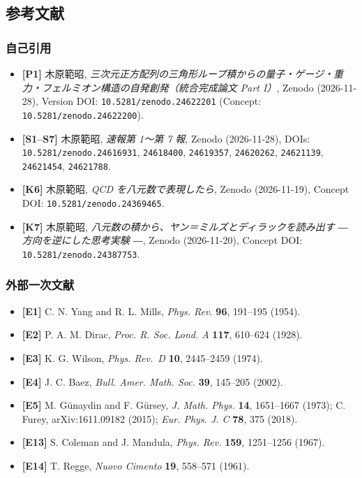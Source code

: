 \documentclass[
  a4paper,
]{ltjsarticle}
\providecommand{\tightlist}{%
  \setlength{\itemsep}{0pt}\setlength{\parskip}{0pt}}
\begin{document}
\subsection{参考文献}\label{ux53c2ux8003ux6587ux732e}

\subsubsection{自己引用}\label{ux81eaux5df1ux5f15ux7528}

\begin{itemize}
\tightlist
\item
  \textbf{{[}P1{]}} 木原範昭,
  \emph{三次元正方配列の三角形ループ積からの量子・ゲージ・重力・フェルミオン構造の自発創発（統合完成論文
  Part I）}, Zenodo (2026-11-28), Version DOI:
  \texttt{10.5281/zenodo.24622201} (Concept:
  \texttt{10.5281/zenodo.24622200}).
\item
  \textbf{{[}S1--S7{]}} 木原範昭, \emph{速報第 1〜第 7 報}, Zenodo
  (2026-11-28), DOIs: \texttt{10.5281/zenodo.24616931},
  \texttt{24618400}, \texttt{24619357}, \texttt{24620262},
  \texttt{24621139}, \texttt{24621454}, \texttt{24621788}.
\item
  \textbf{{[}K6{]}} 木原範昭, \emph{QCD を八元数で表現したら}, Zenodo
  (2026-11-19), Concept DOI: \texttt{10.5281/zenodo.24369465}.
\item
  \textbf{{[}K7{]}} 木原範昭,
  \emph{八元数の積から、ヤン＝ミルズとディラックを読み出す ―
  方向を逆にした思考実験 ―}, Zenodo (2026-11-20), Concept DOI:
  \texttt{10.5281/zenodo.24387753}.
\end{itemize}

\subsubsection{外部一次文献}\label{ux5916ux90e8ux4e00ux6b21ux6587ux732e}

\begin{itemize}
\tightlist
\item
  \textbf{{[}E1{]}} C. N. Yang and R. L. Mills, \emph{Phys. Rev.}
  \textbf{96}, 191--195 (1954).
\item
  \textbf{{[}E2{]}} P. A. M. Dirac, \emph{Proc. R. Soc. Lond. A}
  \textbf{117}, 610--624 (1928).
\item
  \textbf{{[}E3{]}} K. G. Wilson, \emph{Phys. Rev.~D} \textbf{10},
  2445--2459 (1974).
\item
  \textbf{{[}E4{]}} J. C. Baez, \emph{Bull. Amer. Math. Soc.}
  \textbf{39}, 145--205 (2002).
\item
  \textbf{{[}E5{]}} M. Günaydin and F. Gürsey, \emph{J. Math. Phys.}
  \textbf{14}, 1651--1667 (1973); C. Furey, arXiv:1611.09182 (2015);
  \emph{Eur. Phys. J. C} \textbf{78}, 375 (2018).
\item
  \textbf{{[}E13{]}} S. Coleman and J. Mandula, \emph{Phys. Rev.}
  \textbf{159}, 1251--1256 (1967).
\item
  \textbf{{[}E14{]}} T. Regge, \emph{Nuovo Cimento} \textbf{19},
  558--571 (1961).
\end{itemize}
\end{document}
